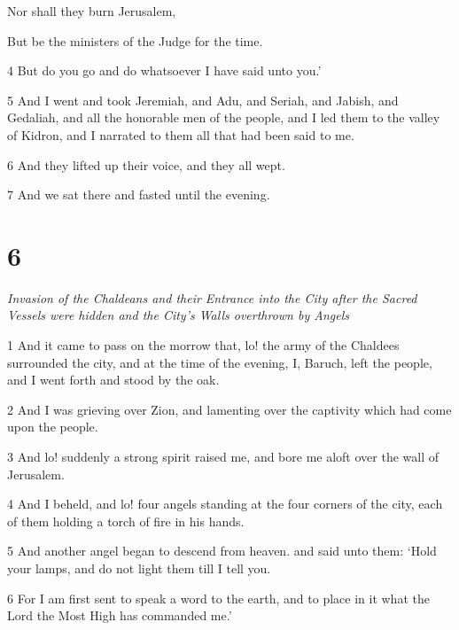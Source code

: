 \par Nor shall they burn Jerusalem,

\par But be the ministers of the Judge for the time.

\par 4 But do you go and do whatsoever I have said unto you.’


\par 5 And I went and took Jeremiah, and Adu, and Seriah, and Jabish, and Gedaliah, and all the honorable men of the people, and I led them to the valley of Kidron, and I narrated to them all that had been said to me. 

\par 6 And they lifted up their voice, and they all wept. 

\par 7 And we sat there and fasted until the evening.

\chapter{6}

\par \textit{Invasion of the Chaldeans and their Entrance into the City after the Sacred Vessels were hidden and the City's Walls overthrown by Angels}

\par 1 And it came to pass on the morrow that, lo! the army of the Chaldees surrounded the city, and at the time of the evening, I, Baruch, left the people, and I went forth and stood by the oak. 

\par 2 And I was grieving over Zion, and lamenting over the captivity which had come upon the people. 

\par 3 And lo! suddenly a strong spirit raised me, and bore me aloft over the wall of Jerusalem. 

\par 4 And I beheld, and lo! four angels standing at the four corners of the city, each of them holding a torch of fire in his hands. 

\par 5 And another angel began to descend from heaven. and said unto them: ‘Hold your lamps, and do not light them till I tell you. 

\par 6 For I am first sent to speak a word to the earth, and to place in it what the Lord the Most High has commanded me.’

